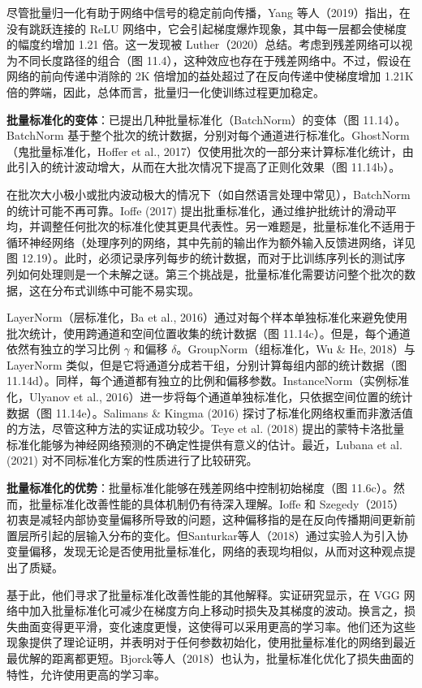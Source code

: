 尽管批量归一化有助于网络中信号的稳定前向传播，Yang 等人（2019）指出，在没有跳跃连接的 ReLU 网络中，它会引起梯度爆炸现象，其中每一层都会使梯度的幅度约增加 1.21 倍。这一发现被 Luther（2020）总结。考虑到残差网络可以视为不同长度路径的组合（图 11.4），这种效应也存在于残差网络中。不过，假设在网络的前向传递中消除的 2K 倍增加的益处超过了在反向传递中使梯度增加 1.21K 倍的弊端，因此，总体而言，批量归一化使训练过程更加稳定。

\textbf{批量标准化的变体}：已提出几种批量标准化（BatchNorm）的变体（图 11.14）。BatchNorm 基于整个批次的统计数据，分别对每个通道进行标准化。GhostNorm（鬼批量标准化，Hoffer et al., 2017）仅使用批次的一部分来计算标准化统计，由此引入的统计波动增大，从而在大批次情况下提高了正则化效果（图 11.14b）。

在批次大小极小或批内波动极大的情况下（如自然语言处理中常见），BatchNorm 的统计可能不再可靠。Ioffe (2017) 提出批重标准化，通过维护批统计的滑动平均，并调整任何批次的标准化使其更具代表性。另一难题是，批量标准化不适用于循环神经网络（处理序列的网络，其中先前的输出作为额外输入反馈进网络，详见图 12.19）。此时，必须记录序列每步的统计数据，而对于比训练序列长的测试序列如何处理则是一个未解之谜。第三个挑战是，批量标准化需要访问整个批次的数据，这在分布式训练中可能不易实现。

LayerNorm（层标准化，Ba et al., 2016）通过对每个样本单独标准化来避免使用批次统计，使用跨通道和空间位置收集的统计数据（图 11.14c）。但是，每个通道依然有独立的学习比例 \(\gamma\) 和偏移 \(\delta\)。GroupNorm（组标准化，Wu \& He, 2018）与LayerNorm 类似，但是它将通道分成若干组，分别计算每组内部的统计数据（图 11.14d）。同样，每个通道都有独立的比例和偏移参数。InstanceNorm（实例标准化，Ulyanov et al., 2016）进一步将每个通道单独标准化，只依据空间位置的统计数据（图 11.14e）。Salimans \& Kingma (2016) 探讨了标准化网络权重而非激活值的方法，尽管这种方法的实证成功较少。Teye et al. (2018) 提出的蒙特卡洛批量标准化能够为神经网络预测的不确定性提供有意义的估计。最近，Lubana et al. (2021) 对不同标准化方案的性质进行了比较研究。

\textbf{批量标准化的优势}：批量标准化能够在残差网络中控制初始梯度（图 11.6c）。然而，批量标准化改善性能的具体机制仍有待深入理解。Ioffe 和 Szegedy（2015）初衷是减轻内部协变量偏移所导致的问题，这种偏移指的是在反向传播期间更新前置层所引起的层输入分布的变化。但Santurkar等人（2018）通过实验人为引入协变量偏移，发现无论是否使用批量标准化，网络的表现均相似，从而对这种观点提出了质疑。

基于此，他们寻求了批量标准化改善性能的其他解释。实证研究显示，在 VGG 网络中加入批量标准化可减少在梯度方向上移动时损失及其梯度的波动。换言之，损失曲面变得更平滑，变化速度更慢，这使得可以采用更高的学习率。他们还为这些现象提供了理论证明，并表明对于任何参数初始化，使用批量标准化的网络到最近最优解的距离都更短。Bjorck等人（2018）也认为，批量标准化优化了损失曲面的特性，允许使用更高的学习率。

